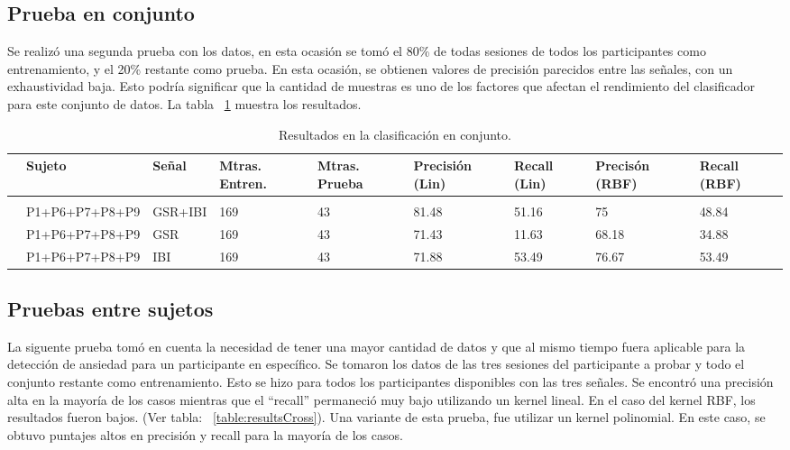 \subsection{Prueba en conjunto}
Se realiz\'o una segunda prueba con los datos, en esta ocasi\'on se tom\'o el 80\% de todas sesiones de todos los participantes como entrenamiento, y el 20\% restante como prueba. En esta ocasi\'on, se obtienen valores de precisi\'on parecidos entre las se\~nales, con un exhaustividad baja. Esto podr\'ia significar que la cantidad de muestras es uno de los factores que afectan el rendimiento del clasificador para este conjunto de datos. La tabla ~\ref{table:resultsall} muestra los resultados.

\begin{table}[h!]
        \footnotesize
        \centering
        \caption{Resultados en la clasificaci\'on en conjunto.}
\label{table:resultsall}
        \begin{tabular}{m{.2cm}m{3.0cm}m{1.5cm}m{1.5cm}m{1.5cm}m{1.5cm}m{1.5cm}m{1.5cm}m{1.5cm}}
                \hline\noalign{\smallskip}
    &\textbf{Sujeto}&\textbf{Se\~nal} &\textbf{Mtras. Entren.}&\textbf{Mtras. Prueba}&\textbf{Precisi\'on (Lin)}& \textbf{Recall (Lin)} & \textbf{Precis\'on (RBF)} &\textbf{Recall (RBF)}\\
	\hline                
 \\\noalign{\smallskip}
&P1+P6+P7+P8+P9&GSR+IBI&169&43&81.48&51.16&75&48.84\\
&P1+P6+P7+P8+P9&GSR&169&43&71.43&11.63&68.18&34.88\\
&P1+P6+P7+P8+P9&IBI&169&43&71.88&53.49&76.67&53.49\\


    \end{tabular}
\end{table}
\subsection{Pruebas entre sujetos}
La siguente prueba tom\'o en cuenta la necesidad de tener una mayor cantidad de datos y que al mismo tiempo fuera aplicable para la detecci\'on de ansiedad para un participante en espec\'ifico. Se tomaron los datos de las tres sesiones del participante a probar y todo el conjunto restante como entrenamiento. Esto se hizo para todos los participantes disponibles con las tres se\~nales. Se encontr\'o una precisi\'on alta en la mayor\'ia de los casos mientras que el ``recall'' permaneci\'o muy bajo utilizando un kernel lineal. En el caso del kernel RBF, los resultados fueron bajos. (Ver tabla: ~\ref{table:resultsCross}). Una variante de esta prueba, fue utilizar un kernel polinomial. En este caso, se obtuvo puntajes altos en precisi\'on y recall para la mayor\'ia de los casos.

